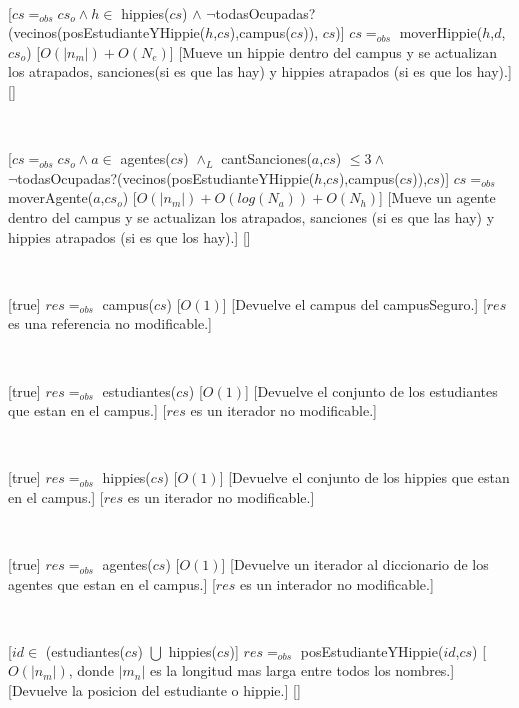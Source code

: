 ~

[$cs =_{obs} cs_o \land h \in$ hippies($cs$) $\land$ $\neg$todasOcupadas?(vecinos(posEstudianteYHippie($h$,$cs$),campus($cs$)), $cs$)]
{$cs =_{obs}$ moverHippie($h$,$d$,$cs_o$)}
[$O(|n_m|) + O(N_e)$]
[Mueve un hippie dentro del campus y se actualizan los atrapados, sanciones(si es que las hay) y hippies atrapados (si es que los hay).]
[]

~

[$cs =_{obs} cs_o \land a \in$ agentes($cs$) $\land_L$ cantSanciones($a$,$cs$) $\leq 3 \land$ \\
$\neg$todasOcupadas?(vecinos(posEstudianteYHippie($h$,$cs$),campus($cs$)),$cs$)]
{$cs =_{obs}$ moverAgente($a$,$cs_o$)}
[$O(|n_m|) + O(log(N_a)) + O(N_h)$]
[Mueve un agente dentro del campus y se actualizan los atrapados, sanciones (si es que las hay) y hippies atrapados (si es que los hay).]
[]

~

[true]
{$res =_{obs}$ campus($cs$)}
[$O(1)$]
[Devuelve el campus del campusSeguro.]
[$res$ es una referencia no modificable.]

~

[true]
{$res =_{obs}$ estudiantes($cs$)}
[$O(1)$]
[Devuelve el conjunto de los estudiantes que estan en el campus.]
[$res$ es un iterador no modificable.]

~

[true]
{$res =_{obs}$ hippies($cs$)}
[$O(1)$]
[Devuelve el conjunto de los hippies que estan en el campus.]
[$res$ es un iterador no modificable.]

~

[true]
{$res =_{obs}$ agentes($cs$)}
[$O(1)$]
[Devuelve un iterador al diccionario de los agentes que estan en el campus.]
[$res$ es un interador no modificable.]

~

[$id \in$ (estudiantes($cs$) $\bigcup$ hippies($cs$)]
{$res =_{obs}$ posEstudianteYHippie($id$,$cs$)}
[$O(|n_m|)$, donde $|m_n|$ es la longitud mas larga entre todos los nombres.]
[Devuelve la posicion del estudiante o hippie.]
[]

